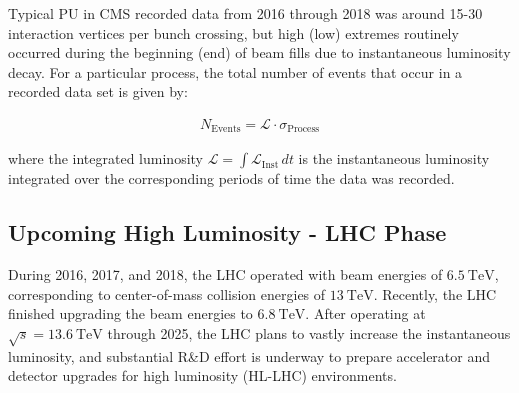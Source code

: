Typical PU in CMS recorded data from 2016 through 2018 was around 15-30 interaction vertices per bunch crossing, but high (low) extremes routinely occurred during the beginning (end) of beam fills due to instantaneous luminosity decay.
For a particular process, the total number of events that occur in a recorded data set is given by:
\begin{linenomath*}
\begin{align}
N_{\text {Events}}= \mathcal{L} \cdot \sigma_{\text{Process}}
\end{align}
\end{linenomath*}
where the integrated luminosity $\mathcal{L} = \int \mathcal{L}_{\text{Inst}} \,dt$ is the instantaneous luminosity integrated over the corresponding periods of time the data was recorded.

\subsection{Upcoming High Luminosity - LHC Phase}
During 2016, 2017, and 2018, the LHC operated with beam energies of $\SI{6.5}{\TeV}$, corresponding to center-of-mass collision energies of $\SI{13}{\TeV}$.
Recently, the LHC finished upgrading the beam energies to $\SI{6.8}{\TeV}$.
After operating at $\sqrt{s}=\SI{13.6}{\TeV}$ through 2025, the LHC plans to vastly increase the instantaneous luminosity, and substantial R\&D effort is underway to prepare accelerator and detector upgrades for high luminosity (HL-LHC) environments.

